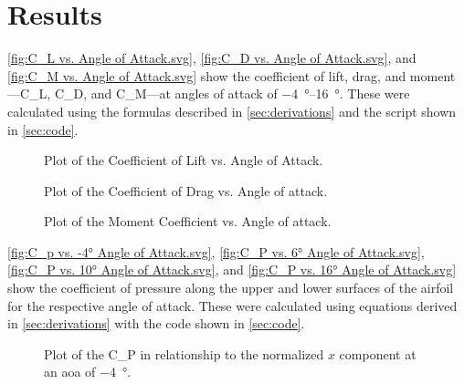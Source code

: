 \chapter{Results}
\label{cp:results}
\autoref{fig:C_L vs. Angle of Attack.svg}, \autoref{fig:C_D vs. Angle of Attack.svg}, and \autoref{fig:C_M vs. Angle of Attack.svg} show the coefficient of lift, drag, and moment—\gls{C_L}, \gls{C_D}, and \gls{C_M}—at angles of attack of \qtyrange{-4}{16}{\degree}. These were calculated using the formulas described in \autoref{sec:derivations} and the script shown in \autoref{sec:code}.

\begin{figure}[htpb]
    \centering
    
    \caption[Plot of the \gls{C_L} vs. Angle of Attack of the airfoil.]{Plot of the Coefficient of Lift vs. Angle of Attack.}
    \label{fig:C_L vs. Angle of Attack.svg}
\end{figure}

\begin{figure}[htpb]
    \centering
    
    \caption[Plot of the \gls{C_D} vs. Angle of attack of the airfoil.]{Plot of the Coefficient of Drag vs. Angle of attack.}
    \label{fig:C_D vs. Angle of Attack.svg}
\end{figure}

\begin{figure}[htpb]
    \centering
    
    \caption[Plot of the \gls{C_M} vs. Angle of attack of the airfoil.]{Plot of the Moment Coefficient vs. Angle of attack.}
    \label{fig:C_M vs. Angle of Attack.svg}
\end{figure}

\autoref{fig:C_p vs. -4° Angle of Attack.svg}, \autoref{fig:C_P vs. 6° Angle of Attack.svg}, \autoref{fig:C_P vs. 10° Angle of Attack.svg}, and \autoref{fig:C_P vs. 16° Angle of Attack.svg} show the coefficient of pressure along the upper and lower surfaces of the airfoil for the respective angle of attack. These were calculated using equations derived in \autoref{sec:derivations} with the code shown in \autoref{sec:code}.

\begin{figure}[htpb]
    \centering
    
    \caption[Plot of the Coefficient of pressure in relationship to the normalized x component at a Angle of attack of -4 degrees]{Plot of the \gls{C_P} in relationship to the normalized $x$ component at an \acrshort{aoa} of \qty{-4}{\degree}.}
    \label{fig:C_p vs. -4° Angle of Attack.svg}
\end{figure}

